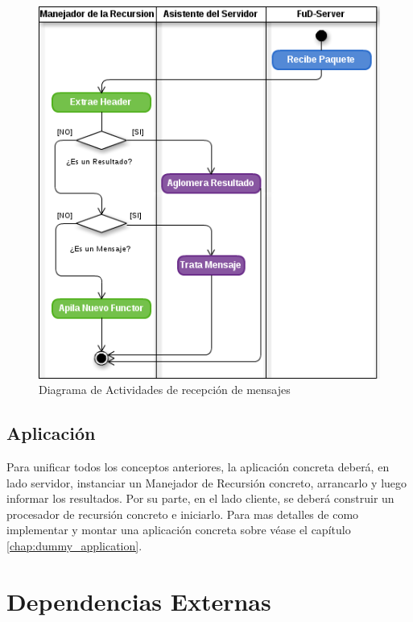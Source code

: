             \begin{figure}[!ht]
                \begin{center}
                    \includegraphics[scale=0.8]{images/ActivityRecAbs-3.png}
                    \end{center}
                    \caption{Diagrama de Actividades de recepción de mensajes}
                \label{activity3}
            \end{figure}

    \subsection{Aplicación}
        Para unificar todos los conceptos anteriores, la aplicación concreta deberá, en lado servidor, instanciar un
        Manejador de Recursión concreto, arrancarlo y luego informar los resultados. Por su parte, en el lado cliente,
        se deberá construir un procesador de recursión concreto e iniciarlo. Para mas detalles de como implementar y
        montar una aplicación concreta sobre \rc{} véase el capítulo \ref{chap:dummy_application}.


\section{Dependencias Externas}

